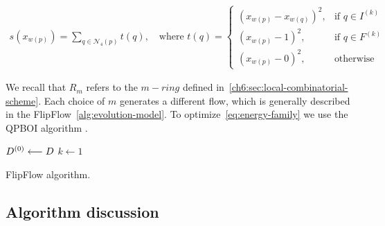 \begin{align}
  s(x_{w(p)})=\sum_{q \in \mathcal{N}_4(p)}{ t(q) }, \quad \text{where } t(q) = \left\{\begin{array}{ll}
  (x_{w(p)}-x_{w(q)})^2, & \text{if } q \in I^{(k)}\\
  (x_{w(p)}-1)^2, & \text{if } q \in F^{(k)}\\
  (x_{w(p)}-0)^2, & \text{otherwise }
  \end{array}\right.
  \label{eq:length-penalization}
\end{align}


We recall that $R_m$ refers to the $m-ring$ defined in~\cref{ch6:sec:local-combinatorial-scheme}. Each choice of $m$ generates a different flow, which is generally described in the FlipFlow~\cref{alg:evolution-model}. To optimize~\cref{eq:energy-family} we use the QPBOI algorithm \cite{rother07qpbo}.


\begin{algorithm}
 
 \BlankLine
 $D^{(0)} \longleftarrow D$\;
 $k \longleftarrow 1$\;
 \caption{FlipFlow algorithm.}
 \label{alg:evolution-model}  
\end{algorithm}

\subsection{Algorithm discussion}
\label{ch7:subsec:flipflow-algorithm-discussion}

